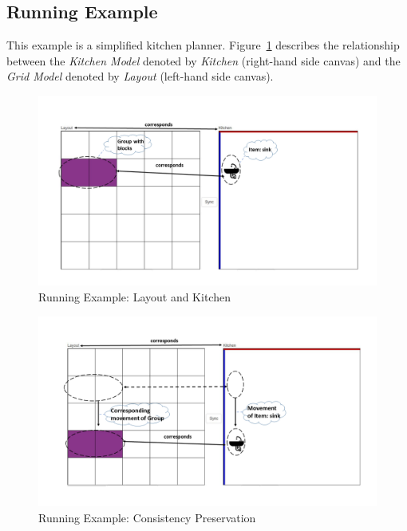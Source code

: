 \subsection{Running Example}\label{subsec:runningexample}
This example is a simplified kitchen planner. Figure~\ref{fig:Running_Example_GUI} describes the relationship between the \textit{Kitchen Model} denoted by \textit{Kitchen} (right-hand side canvas) and the \textit{Grid Model} denoted by \textit{Layout} (left-hand side canvas). 

\begin{figure}[h]
	\centering
	\includegraphics[width=1\textwidth]{figures/KitchenToGrid}
	\caption{Running Example: Layout and Kitchen}
	\label{fig:Running_Example_GUI}
\end{figure} 

\begin{figure}[h]
	\centering
	\includegraphics[width=1\textwidth]{figures/KitchenToGrid_consistency}
	\caption{Running Example: Consistency Preservation}
	\label{fig:Running_Example_GUI_consistency}
\end{figure}

